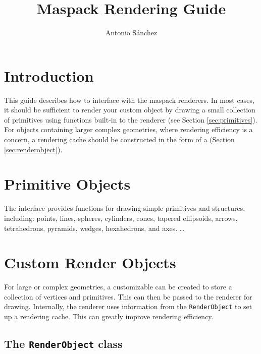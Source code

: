 \documentclass{article}
\title{Maspack Rendering Guide}
\author{Antonio S\'anchez}
\date{}
\begin{document}
\maketitle

\iflatexml{\large\pubdate}\fi

\tableofcontents



\section{Introduction}

This guide describes how to interface with the maspack renderers.  In most cases,
it should be sufficient to render your custom object by drawing a small collection of 
primitives using functions built-in to the renderer (see Section \ref{sec:primitives}).
For objects containing larger complex geometries, where rendering efficiency
is a concern, a rendering cache should be constructed in the form of a 
 (Section \ref{sec:renderobject}).

\section{Primitive Objects \label{sec:primitives}}

The  interface provides functions for drawing simple
primitives and structures, including: points, lines, spheres, cylinders,
cones, tapered ellipsoids, arrows, tetrahedrons, pyramids, wedges, hexahedrons,
and axes.  \ldots

\section{Custom Render Objects}

For large or complex geometries, a customizable  can be 
created to store a collection of vertices and primitives.  This can then be
passed to the renderer for drawing.  Internally, the renderer uses information
from the \lstinline{RenderObject} to set up a rendering cache.  This can greatly improve
rendering efficiency.

\subsection{The \texttt{RenderObject} class \label{sec:renderobject}}
\end{document}
